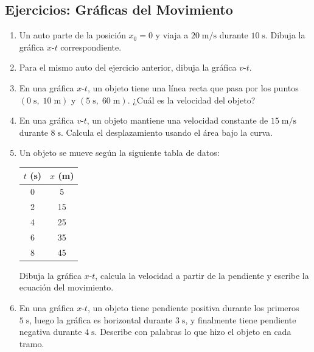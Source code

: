 \documentclass[12pt, letterpaper]{article}
\begin{document}
\newpage

\subsection{Ejercicios: Gráficas del Movimiento}

\begin{enumerate}[leftmargin=*, resume]
  \item \facil{} Un auto parte de la posición $x_0 = 0$ y viaja a $20\;\text{m/s}$ durante $10\;\text{s}$. Dibuja la gráfica $x$-$t$ correspondiente.

  \item \facil{} Para el mismo auto del ejercicio anterior, dibuja la gráfica $v$-$t$.

  \item \facil{} En una gráfica $x$-$t$, un objeto tiene una línea recta que pasa por los puntos $(0\;\text{s},\; 10\;\text{m})$ y $(5\;\text{s},\; 60\;\text{m})$. ¿Cuál es la velocidad del objeto?

  \item \facil{} En una gráfica $v$-$t$, un objeto mantiene una velocidad constante de $15\;\text{m/s}$ durante $8\;\text{s}$. Calcula el desplazamiento usando el área bajo la curva.

  \item \medio{} Un objeto se mueve según la siguiente tabla de datos:
        \begin{center}
          \begin{tabular}{c|c}
            $t$ (s) & $x$ (m) \\
            \hline
            0       & 5       \\
            2       & 15      \\
            4       & 25      \\
            6       & 35      \\
            8       & 45      \\
          \end{tabular}
        \end{center}
        Dibuja la gráfica $x$-$t$, calcula la velocidad a partir de la pendiente y escribe la ecuación del movimiento.

  \item \medio{} En una gráfica $x$-$t$, un objeto tiene pendiente positiva durante los primeros $5\;\text{s}$, luego la gráfica es horizontal durante $3\;\text{s}$, y finalmente tiene pendiente negativa durante $4\;\text{s}$. Describe con palabras lo que hizo el objeto en cada tramo.


\end{enumerate}
\end{document}
